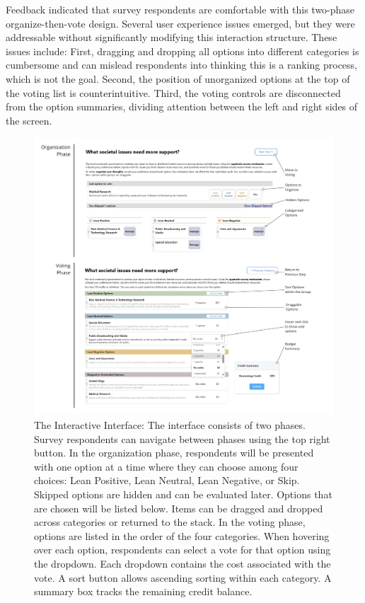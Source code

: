 Feedback indicated that survey respondents are comfortable with this two-phase organize-then-vote design. Several user experience issues emerged, but they were addressable without significantly modifying this interaction structure. These issues include: First, dragging and dropping all options into different categories is cumbersome and can mislead respondents into thinking this is a ranking process, which is not the goal. Second, the position of unorganized options at the top of the voting list is counterintuitive. Third, the voting controls are disconnected from the option summaries, dividing attention between the left and right sides of the screen.

\begin{figure}[ht]
    \centering
    \includegraphics[width=1\textwidth]{content/image/detailed.pdf}
    \caption{The Interactive Interface: The interface consists of two phases. Survey respondents can navigate between phases using the top right button. In the organization phase, respondents will be presented with one option at a time where they can choose among four choices: Lean Positive, Lean Neutral, Lean Negative, or Skip. Skipped options are hidden and can be evaluated later. Options that are chosen will be listed below. Items can be dragged and dropped across categories or returned to the stack. In the voting phase, options are listed in the order of the four categories. When hovering over each option, respondents can select a vote for that option using the dropdown. Each dropdown contains the cost associated with the vote. A sort button allows ascending sorting within each category. A summary box tracks the remaining credit balance.}
    \label{fig:interactiveInterface}
\end{figure}

